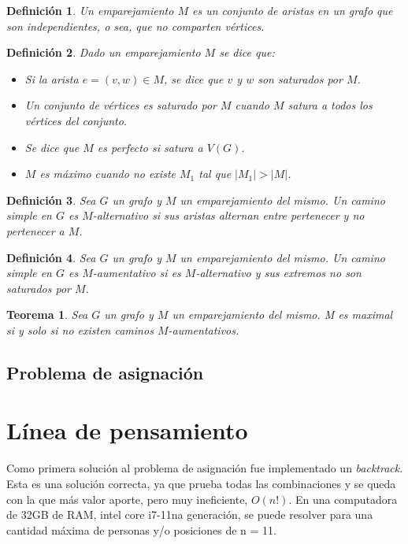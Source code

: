 \documentclass[10pt]{article} %
\newtheorem{thm}{Teorema}
\newtheorem{mydef}{Definici\'on}%
\begin{document}
	\begin{mydef}
		Un emparejamiento $ M $ es un conjunto de aristas en un grafo que son independientes, o sea, que no comparten v\'ertices.
	\end{mydef}

	\begin{mydef}
		Dado un emparejamiento $ M $ se dice que:
		\begin{itemize}
			\item Si la arista $ e = (v, w) \in M $, se dice que $ v $ y $ w $ son saturados por $ M $.
			\item Un conjunto de v\'ertices es saturado por $ M $ cuando $ M $ satura a todos los v\'ertices del conjunto.
			\item Se dice que $ M $ es perfecto si satura a $ V(G) $.
			\item $ M $ es m\'aximo cuando no existe $ M_{1} $ tal que $ |M_{1}| > |M| $.
		\end{itemize}
	\end{mydef}

	\begin{mydef}
		Sea $ G $ un grafo y $ M $ un emparejamiento del mismo. Un camino simple en $ G $ es $ M $-alternativo si sus aristas alternan entre pertenecer y no pertenecer a $ M $.
	\end{mydef}
	
	\begin{mydef}
		Sea $ G $ un grafo y $ M $ un emparejamiento del mismo. Un camino simple en $ G $ es $ M $-aumentativo si es $ M $-alternativo y sus extremos no son saturados por $ M $.
	\end{mydef}
	
	\begin{thm}
		Sea $ G $ un grafo y $ M $ un emparejamiento del mismo. M es maximal si y solo si no existen caminos $ M $-aumentativos.
	\end{thm}
	
	\subsection{Problema de asignaci\'on}
	
	\section{L\'inea de pensamiento}
	
	Como primera soluci\'on al problema de asignaci\'on fue implementado un \textit{backtrack}. Esta es una soluci\'on correcta, ya que prueba todas las combinaciones y se queda con la que m\'as valor aporte, pero muy ineficiente, $ O(n!) $. En una computadora de 32GB de RAM, intel core i7-11na generaci\'on, se puede resolver para una cantidad m\'axima de personas y/o posiciones de n = 11. 
	
\end{document}
